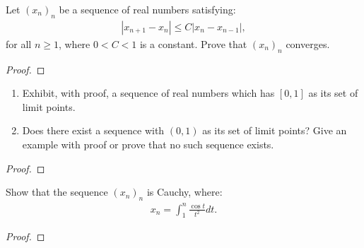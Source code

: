 \documentclass[11pt,twoside,openany]{memoir}
\begin{document}
\newpage
\fancyhead[L]{\scalebox{0.9}{Sequences}}
\fancyhead[R]{\scalebox{0.9}{Appeared on: F15}}
\begin{problem}
    Let $(x_n)_n$ be a sequence of real numbers satisfying:
        \begin{equation*}
        \begin{split}
            \left| x_{n+1} - x_n \right| \leq C \left| x_n - x_{n-1} \right|,
        \end{split}
        \end{equation*}
    for all $n \geq 1$, where $0 < C < 1$ is a constant. Prove that $(x_n)_n$ converges.
\end{problem}
\begin{proof}
\end{proof}

\newpage
\fancyhead[L]{\scalebox{0.9}{Sequences}}
\fancyhead[R]{\scalebox{0.9}{Appeared on: F24}}
\begin{problem}
    \phantom{a}
    \begin{enumerate}[label = (\arabic*)]
        \item Exhibit, with proof, a sequence of real numbers which has $[0,1]$ as its set of limit points.
        \item Does there exist a sequence with $(0,1)$ as its set of limit points? Give an example with proof or prove that no such sequence exists.
    \end{enumerate}
\end{problem}
\begin{proof}
\end{proof}

\newpage
\fancyhead[L]{\scalebox{0.9}{Sequences}}
\fancyhead[R]{\scalebox{0.9}{Appeared on: W23}}
\begin{problem}
    Show that the sequence $(x_n)_n$ is Cauchy, where:
        \begin{equation*}
        \begin{split}
            x_n = \int_1^n \frac{\cos t}{t^2}dt.
        \end{split}
        \end{equation*}
\end{problem}
\begin{proof}
\end{proof}
\end{document}
